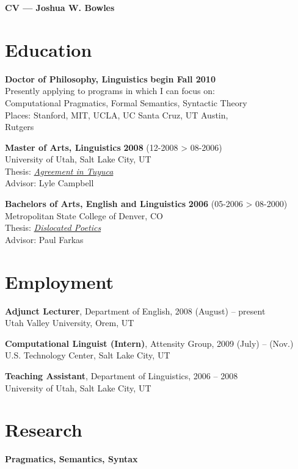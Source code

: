\documentclass[margin,line]{resume}
\begin{document}
 
{\sc \Large {\bf CV --- Joshua W. Bowles}}
\begin{resume}
   

\section{Education}
{\bf Doctor of Philosophy, Linguistics} \hfill {\bf begin Fall 2010} \\ 
Presently applying to programs in which I can focus on:\\ Computational Pragmatics, Formal Semantics, Syntactic Theory\\ Places: Stanford, MIT, UCLA, UC Santa Cruz, UT Austin,\\ Rutgers  

{\bf Master of Arts, Linguistics} \hfill {\bf 2008} (12-2008 \textgreater{} 08-2006) \\ 
University of Utah, Salt Lake City, UT\\ Thesis: \href{http://sites.google.com/site/bowleslinguistics/Home/research}{\emph{Agreement in Tuyuca}}\\ Advisor: Lyle Campbell 

{\bf Bachelors of Arts, English and Linguistics} \hfill {\bf 2006} (05-2006 \textgreater{} 08-2000) \\ Metropolitan State College of Denver, CO\\ Thesis: \href{http://sites.google.com/site/bowleslinguistics/Home/research/misc-1/symmetry-1/literature}{\emph{Dislocated Poetics}}\\ Advisor: Paul Farkas 
 

\section{Employment}
 {\bf Adjunct Lecturer}, Department of English, \hfill 2008 (August) -- present\\
    Utah Valley University, Orem, UT 		

{\bf Computational Linguist (Intern)}, Attensity Group, \hfill 2009 (July) -- (Nov.)\\
		U.S. Technology Center, Salt Lake City, UT  
		 
   
 
    {\bf Teaching Assistant}, Department of Linguistics, \hfill 2006 -- 2008\\ 
    University of Utah, Salt Lake City, UT 
 
\section{Research} 
{\bf Pragmatics, Semantics, Syntax}


\end{resume}
\end{document}
